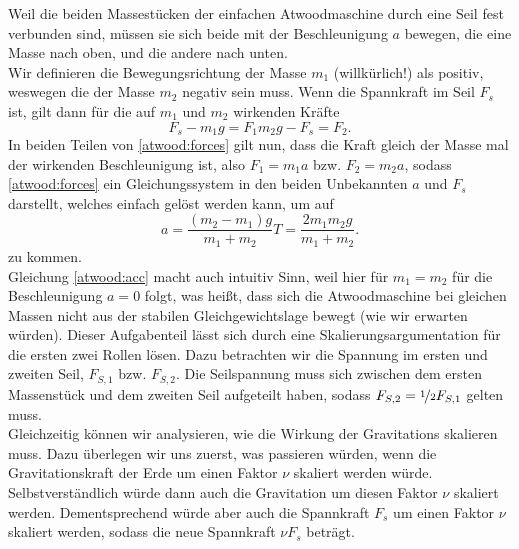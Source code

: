 \begin{Answer}[ref = atwood]
	\Question Weil die beiden Massestücken der einfachen Atwoodmaschine durch eine Seil fest verbunden sind, müssen sie sich beide mit der Beschleunigung $a$ bewegen, die eine Masse nach oben, und die andere nach unten.\\
	Wir definieren die Bewegungsrichtung der Masse $m_1$ (willkürlich!) als positiv, weswegen die der Masse $m_2$ negativ sein muss. Wenn die Spannkraft im Seil $F_s$ ist, gilt dann für die auf $m_1$ und $m_2$ wirkenden Kräfte
	\begin{subequations}\label{atwood:forces}
		\begin{equation}
			F_s - m_1 g = F_1
		\end{equation}
		\begin{equation}
			m_2 g - F_s = F_2.
		\end{equation}
	\end{subequations}
	In beiden Teilen von \eqref{atwood:forces} gilt nun, dass die Kraft gleich der Masse mal der wirkenden Beschleunigung ist, also $F_1 = m_1 a$ bzw. $F_2 = m_2 a$, sodass \eqref{atwood:forces} ein Gleichungssystem in den beiden Unbekannten $a$ und $F_s$ darstellt, welches einfach gelöst werden kann, um auf
	\begin{subequations}
			\begin{equation}\label{atwood:acc}
			\boxed{	a = \frac{\left(m_2-m_1\right)g}{m_1+m_2}}
			\end{equation}
			\begin{equation}
			\boxed{				T = \frac{2m_1m_2g}{m_1+m_2}.}
			\end{equation}
	\end{subequations}
	zu kommen. \\
	Gleichung \eqref{atwood:acc} macht auch intuitiv Sinn, weil hier für $m_1 = m_2$ für die Beschleunigung $a= 0$ folgt, was heißt, dass sich die Atwoodmaschine bei gleichen Massen nicht aus der stabilen Gleichgewichtslage bewegt (wie wir erwarten würden).
	\Question Dieser Aufgabenteil lässt sich durch eine Skalierungsargumentation für die ersten zwei Rollen lösen. Dazu betrachten wir die Spannung im ersten und zweiten Seil, $F_{S,1}$ bzw. $F_{S,2}$. Die Seilspannung muss sich zwischen dem ersten Massenstück und dem zweiten Seil aufgeteilt haben, sodass $F_{S,2} = \nicefrac{1}{2} F_{S,1}$ gelten muss. \\
	Gleichzeitig können wir analysieren, wie die Wirkung der Gravitations skalieren muss. Dazu überlegen wir uns zuerst, was passieren würden, wenn die Gravitationskraft der Erde um einen Faktor $\nu$ skaliert werden würde. Selbstverständlich würde dann auch die Gravitation um diesen Faktor $\nu$ skaliert werden. Dementsprechend würde aber auch die Spannkraft $F_s$ um einen Faktor $\nu$ skaliert werden, sodass die neue Spannkraft $\nu F_s$ beträgt.\\

\end{Answer}
